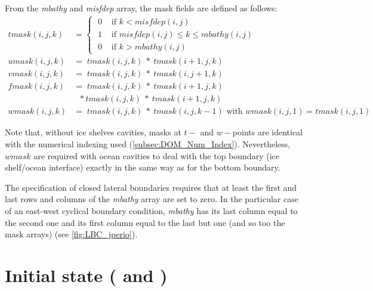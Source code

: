 \documentclass[../main/NEMO_manual]{subfiles}
\begin{document}
From the \textit{mbathy} and \textit{misfdep} array, the mask fields are defined as follows:
\begin{align*}
  tmask(i,j,k) &= \begin{cases}   \; 0&   \text{ if $k < misfdep(i,j) $ } \\
    \; 1&   \text{ if $misfdep(i,j) \leq k\leq mbathy(i,j)$  }    \\
    \; 0&   \text{ if $k > mbathy(i,j)$  }    \end{cases}     \\
  umask(i,j,k) &=         \; tmask(i,j,k) \ * \ tmask(i+1,j,k)	\\
  vmask(i,j,k) &=         \; tmask(i,j,k) \ * \ tmask(i,j+1,k)	\\
  fmask(i,j,k) &=         \; tmask(i,j,k) \ * \ tmask(i+1,j,k)	\\
               &    \ \ \, * tmask(i,j,k) \ * \ tmask(i+1,j,k) \\
  wmask(i,j,k) &=         \; tmask(i,j,k) \ * \ tmask(i,j,k-1) \text{ with } wmask(i,j,1) = tmask(i,j,1)
\end{align*}

Note that, without ice shelves cavities,
masks at $t-$ and $w-$points are identical with the numerical indexing used (\autoref{subsec:DOM_Num_Index}).
Nevertheless, $wmask$ are required with ocean cavities to deal with the top boundary (ice shelf/ocean interface) 
exactly in the same way as for the bottom boundary. 

The specification of closed lateral boundaries requires that at least
the first and last rows and columns of the \textit{mbathy} array are set to zero.
In the particular case of an east-west cyclical boundary condition,
\textit{mbathy} has its last column equal to the second one and its first column equal to the last but one 
(and so too the mask arrays) (see \autoref{fig:LBC_jperio}).


\section{Initial state (\protect{} and \protect{})}
\label{sec:DTA_tsd}

\end{document}
